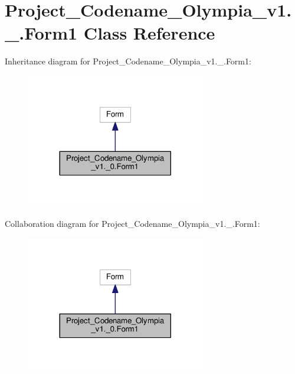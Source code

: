 \hypertarget{classProject__Codename__Olympia__v1_1_1__0_1_1Form1}{}\section{Project\+\_\+\+Codename\+\_\+\+Olympia\+\_\+v1.\+\_.\+Form1 Class Reference}
\label{classProject__Codename__Olympia__v1_1_1__0_1_1Form1}


Inheritance diagram for Project\+\_\+\+Codename\+\_\+\+Olympia\+\_\+v1.\+\_.\+Form1\+:
\nopagebreak
\begin{figure}[H]
\begin{center}
\leavevmode
\includegraphics[width=221pt]{classProject__Codename__Olympia__v1_1_1__0_1_1Form1__inherit__graph}
\end{center}
\end{figure}


Collaboration diagram for Project\+\_\+\+Codename\+\_\+\+Olympia\+\_\+v1.\+\_.\+Form1\+:
\nopagebreak
\begin{figure}[H]
\begin{center}
\leavevmode
\includegraphics[width=221pt]{classProject__Codename__Olympia__v1_1_1__0_1_1Form1__coll__graph}
\end{center}
\end{figure}
